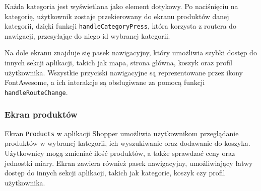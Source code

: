 Każda kategoria jest wyświetlana jako element dotykowy. Po naciśnięciu na kategorię, użytkownik zostaje przekierowany do ekranu produktów danej kategorii, dzięki funkcji \texttt{handleCategoryPress}, która korzysta z routera do nawigacji, przesyłając do niego id wybranej kategorii.

Na dole ekranu znajduje się pasek nawigacyjny, który umożliwia szybki dostęp do innych sekcji aplikacji, takich jak mapa, strona główna, koszyk oraz profil użytkownika. Wszystkie przyciski nawigacyjne są reprezentowane przez ikony FontAwesome, a ich interakcje są obsługiwane za pomocą funkcji \texttt{handleRouteChange}.

\subsubsection{Ekran produktów}

Ekran \texttt{Products} w aplikacji Shopper umożliwia użytkownikom przeglądanie produktów w wybranej kategorii, ich wyszukiwanie oraz dodawanie do koszyka. Użytkownicy mogą zmieniać ilość produktów, a także sprawdzać ceny oraz jednostki miary. Ekran zawiera również pasek nawigacyjny, umożliwiający łatwy dostęp do innych sekcji aplikacji, takich jak kategorie, koszyk czy profil użytkownika.

